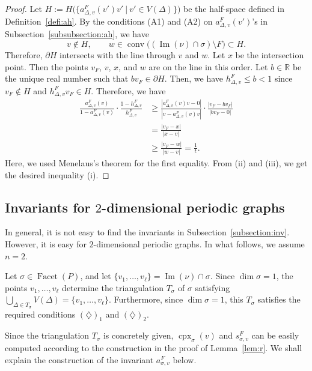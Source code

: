 \documentclass[11pt]{article}
\theoremstyle{definition}
\numberwithin{equation}{section}
\begin{document}
\begin{proof}
Let $H := H \bigl( \bigl \{ a^{F} _{\Delta, v} (v') v' \ \big| \  v' \in V(\Delta) \bigr \} \bigr)$ be the half-space defined in Definition~\ref{defi:ah}. 
By the conditions (A1) and (A2) on $a^{F} _{\Delta, v} (v')$'s in Subsection~\ref{subsubsection:ah}, we have 
\[
v \not \in H, \qquad w \in \operatorname{conv} \bigl( (\operatorname{Im}(\nu) \cap \sigma ) \setminus F \bigr) \subset H. 
\]
Therefore, $\partial H$ intersects with the line through $v$ and $w$.
Let $x$ be the intersection point.  
Then the points $v_F$, $v$, $x$, and $w$ are on the line in this order. 
Let $b \in \mathbb{R}$ be the unique real number such that $bv_F \in \partial H$. 
Then, we have $h^F _{\Delta,v} \le b < 1$ since $v_F \not\in H$ and $h^F _{\Delta,v} v_F \in H$.
Therefore, we have
\begin{align*}\tag{iii}
	\frac{a_{\Delta,v}^F(v)}{1-a^F_{\Delta,v}(v)} \cdot \frac{1-h^F_{\Delta,v}}{h^F_{\Delta,v}}
	&\ge \frac{\left \lvert a_{\Delta,v}^F(v)v-0 \right \rvert}{\left \lvert v-a^F_{\Delta,v}(v)v \right \rvert} \cdot 
		\frac{\left \lvert v_F-bv_F \right \rvert}{\lvert bv_F-0 \rvert } \\
	&=\frac{\lvert v_F-x \rvert}{\lvert x-v \rvert} \\
	&\ge \frac{\lvert v_F-w \rvert}{\lvert w-v \rvert} = \frac{1}{t}. 
\end{align*}
Here, we used Menelaus's theorem for the first equality. 
From (ii) and (iii), we get the desired inequality (i). 
\end{proof}


\subsection{Invariants for \texorpdfstring{$2$}{2}-dimensional periodic graphs}\label{subsection:2dim}
In general, it is not easy to find the invariants in Subsection~\ref{subsection:inv}. 
However, it is easy for $2$-dimensional periodic graphs. 
In what follows, we assume $n = 2$. 


Let $\sigma \in \operatorname{Facet}(P)$, and let $\{ v_1, \ldots , v_{\ell} \} = \operatorname{Im}(\nu) \cap \sigma$. 
Since $\dim \sigma = 1$, the points $v_1, \ldots , v_{\ell}$ determine the triangulation $T_{\sigma}$ of $\sigma$ satisfying 
$\bigcup _{\Delta \in T_{\sigma}} V(\Delta) = \{ v_1, \ldots , v_{\ell} \}$. 
Furthermore, since $\dim \sigma = 1$, this $T_{\sigma}$ satisfies the required conditions $(\diamondsuit)_1$ and $(\diamondsuit)_2$. 

Since the triangulation $T_{\sigma}$ is concretely given, 
$\operatorname{cpx}_{\sigma} (v)$ and $s_{\sigma, v} ^F$ can be easily computed according to the construction in the proof of Lemma~\ref{lem:r}. 
We shall explain the construction of the invariant $a_{\sigma, v}^F$ below. 
\end{document}
